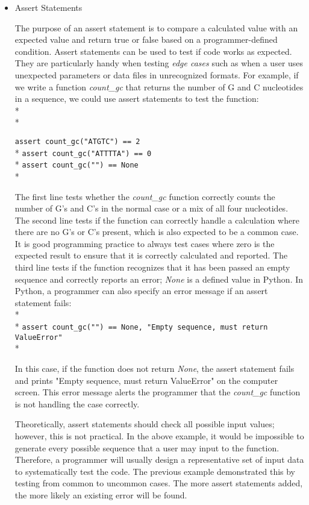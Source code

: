 \documentclass[ChapterTOCs,krantz2]{krantz} %
\begin{document}
\begin{itemize}
\item Assert Statements

The purpose of an assert statement is to compare
a calculated value with an expected value and return true or false
based on a programmer-defined condition. Assert statements can be used to
test if code works as expected.  They are
particularly handy when testing \emph{edge cases} such as when a user
uses unexpected parameters or data files in unrecognized formats.
For example, if we write a function \emph{count\_gc} that returns the number of
G and C nucleotides in a sequence, we could use assert statements to test the
function:\\* \\*

\texttt{assert count\_gc("ATGTC") == 2}\\*
\texttt{assert count\_gc("ATTTTA") == 0}\\*
\texttt{assert count\_gc("") == None}\\*

The first line tests whether the \emph{count\_gc} function correctly counts the number
of G's and C's in the normal case or a mix of all four nucleotides.  The second
line tests if the function can correctly handle a calculation where there are
no G's or C's present, which is also expected to be a common case.  It is good
programming practice to always test cases where zero is the expected result to
ensure that it is correctly calculated and reported.  The third line tests if
the function recognizes that it has been passed an empty sequence and correctly
reports an error; \emph{None} is a defined value in Python. In
Python, a programmer can also specify an error message if an assert statement
fails:\\* \\*
\texttt{assert count\_gc("") == None, "Empty sequence, must return ValueError"}\\*

In this case, if the function does not return \emph{None}, the assert statement
fails and prints "Empty sequence, must return ValueError" on the computer
screen.
This error message alerts the programmer that the \emph{count\_gc} function
is not handling the case correctly.  

Theoretically, assert statements should check all possible input
values; however, this is not practical. In the above example, it
would be impossible to generate every possible sequence that a user may
input to the function.  Therefore, a programmer will usually design
a representative set of input data to systematically test the code.  The
previous example demonstrated this by testing 
from common to uncommon cases.  The more assert statements
added, the more likely an existing error will be found.  


\end{itemize}
\end{document}
